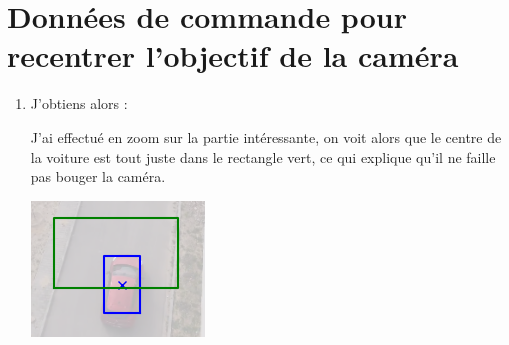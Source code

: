 \section{Données de commande pour recentrer l'objectif de la caméra}

\begin{enumerate}
  \item {}

        J'obtiens alors :

        J'ai effectué en zoom sur la partie intéressante, on voit alors que le
        centre de la voiture est tout juste dans le rectangle vert,
        ce qui explique qu'il ne faille pas bouger la caméra.
        \begin{center}
          \includegraphics[scale=0.8]{section-05/q1-4.png}
        \end{center}
\end{enumerate}
